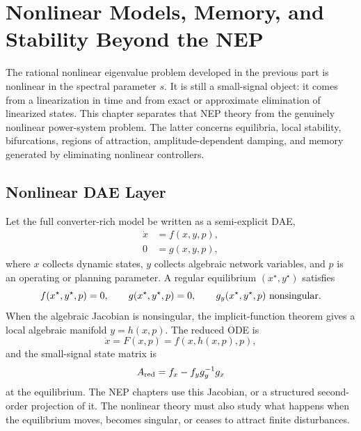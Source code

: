 \chapter{Nonlinear Models, Memory, and Stability Beyond the NEP}

The rational nonlinear eigenvalue problem developed in the previous part is
nonlinear in the spectral parameter \(s\). It is still a small-signal object:
it comes from a linearization in time and from exact or approximate
elimination of linearized states. This chapter separates that NEP theory from
the genuinely nonlinear power-system problem. The latter concerns equilibria,
local stability, bifurcations, regions of attraction, amplitude-dependent
damping, and memory generated by eliminating nonlinear controllers.


\section{Nonlinear DAE Layer}

Let the full converter-rich model be written as a semi-explicit DAE,
\begin{align}
  \dot x &= f(x,y,p), \label{eq:nonlin_dae_f}\\
  0 &= g(x,y,p), \label{eq:nonlin_dae_g}
\end{align}
where \(x\) collects dynamic states, \(y\) collects algebraic network
variables, and \(p\) is an operating or planning parameter. A regular
equilibrium \((x^\star,y^\star)\) satisfies
\begin{equation}
  f(x^\star,y^\star,p)=0,\qquad
  g(x^\star,y^\star,p)=0,
  \qquad
  g_y(x^\star,y^\star,p)\ \hbox{nonsingular}.
  \label{eq:nonlin_equilibrium_regular}
\end{equation}
When the algebraic Jacobian is nonsingular, the implicit-function theorem gives
a local algebraic manifold \(y=h(x,p)\). The reduced ODE is
\begin{equation}
  \dot x=F(x,p)=f(x,h(x,p),p),
  \label{eq:nonlin_reduced_ode}
\end{equation}
and the small-signal state matrix is
\begin{equation}
  A_{\rm red}
  =
  f_x-f_y g_y^{-1}g_x
  \label{eq:nonlin_reduced_jacobian}
\end{equation}
at the equilibrium. The NEP chapters use this Jacobian, or a structured
second-order projection of it. The nonlinear theory must also study what
happens when the equilibrium moves, becomes singular, or ceases to attract
finite disturbances.

